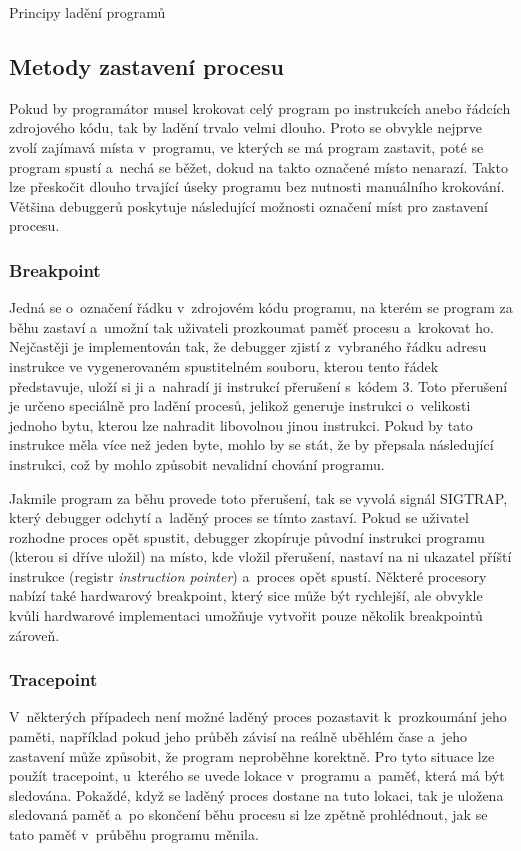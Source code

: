 \documentclass[czech,bachelor,male,python,dept460,hidelinks]{diploma}						%
\newcommand{\parspace}[1][]{
	\ifthenelse{\isempty{#1}}{\vspace{0mm}}{\vspace{#1}}
	\par
}
\begin{document}
\begin{section}{Principy ladění programů}
	\subsection{Metody zastavení procesu}
		Pokud by programátor musel krokovat celý program po instrukcích anebo řádcích zdrojového kódu, tak by ladění trvalo velmi dlouho.
		Proto se obvykle nejprve zvolí zajímavá místa v~programu, ve kterých se má program zastavit, poté se program spustí a~nechá se běžet, dokud na takto
		označené místo nenarazí. Takto lze přeskočit dlouho trvající úseky programu bez nutnosti manuálního krokování. Většina debuggerů poskytuje následující
		možnosti označení míst pro zastavení procesu.
		
		\subsubsection{Breakpoint}
			Jedná se o~označení řádku v~zdrojovém kódu programu, na kterém se program za běhu zastaví a~umožní tak uživateli prozkoumat paměť procesu a~krokovat ho.
			Nejčastěji je implementován tak, že debugger zjistí z~vybraného řádku adresu instrukce ve vygenerovaném spustitelném souboru, kterou tento
			řádek představuje, uloží si ji a~nahradí ji instrukcí přerušení s~kódem 3. Toto přerušení je určeno speciálně pro ladění procesů, jelikož generuje
			instrukci o~velikosti jednoho bytu, kterou lze nahradit libovolnou jinou instrukci. \cite[306]{intel} Pokud by tato instrukce měla více než jeden byte,
			mohlo by se stát, že by přepsala následující instrukci, což by mohlo způsobit nevalidní chování programu.
			
			\parspace Jakmile program za běhu provede toto přerušení, tak se vyvolá signál SIGTRAP, který debugger odchytí a~laděný proces se tímto zastaví.
			Pokud se uživatel rozhodne proces opět spustit, debugger zkopíruje původní instrukci programu (kterou si dříve uložil) na místo, kde vložil
			přerušení, nastaví na ni ukazatel příští instrukce (registr \textit{instruction pointer}) a~proces opět spustí. \cite{eli-breakpoints}
			Některé procesory nabízí také hardwarový breakpoint, který sice může být rychlejší, ale obvykle kvůli hardwarové implementaci umožňuje
			vytvořit pouze několik breakpointů zároveň.
		\subsubsection{Tracepoint}
			V~některých případech není možné laděný proces pozastavit k~prozkoumání jeho paměti, například pokud jeho průběh závisí na reálně uběhlém čase a~jeho
			zastavení může způsobit, že program neproběhne korektně. Pro tyto situace lze použít tracepoint, u~kterého se uvede lokace v~programu a~paměť, která má být
			sledována. Pokaždé, když se laděný proces dostane na tuto lokaci, tak je uložena sledovaná paměť a~po skončení běhu procesu si lze zpětně prohlédnout,
			jak se tato paměť v~průběhu programu měnila.

\end{section}
\end{document}
